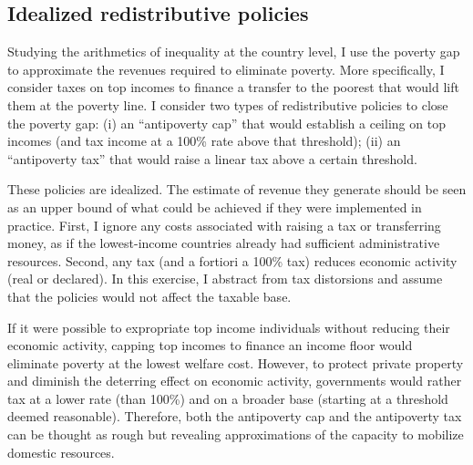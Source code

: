 \subsection{Idealized redistributive policies}

Studying the arithmetics of inequality at the country level, I use the poverty gap to approximate the revenues required to eliminate poverty. 
More specifically, I consider taxes on top incomes to finance a transfer to the poorest that would lift them at the poverty line. I consider two types of redistributive policies to close the poverty gap: (i) an ``antipoverty cap'' that would establish a ceiling on top incomes (and tax income at a 100\% rate above that threshold); (ii) an ``antipoverty tax'' that would raise a linear tax above a certain threshold. 

These policies are idealized. The estimate of revenue they generate should be seen as an upper bound of what could be achieved if they were implemented in practice. 
First, I ignore any costs associated with raising a tax or transferring money, as if the lowest-income countries already had sufficient administrative resources. Second, any tax (and a fortiori a 100\% tax) reduces economic activity (real or declared). In this exercise, I abstract from tax distorsions and assume that the policies would not affect the taxable base.%

If it were possible to expropriate top income individuals 
without reducing their economic activity, capping top incomes to finance an income floor would eliminate poverty at the lowest welfare cost. 
However, to protect private property and diminish the deterring effect on economic activity, governments would rather tax at a lower rate (than 100\%) and on a broader base (starting at a threshold deemed reasonable). 
Therefore, both the antipoverty cap and the antipoverty tax can be thought as rough but revealing approximations of the capacity to mobilize domestic resources.

